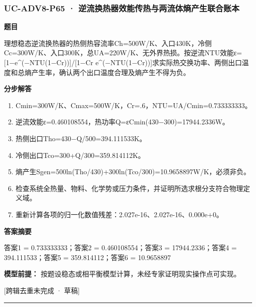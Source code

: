 \documentclass[UTF8,11pt,a4paper]{ctexart}
\begin{document}
\subsubsection*{UC-ADV8-P65 · 逆流换热器效能传热与两流体熵产生联合账本}
\noindent\textbf{题目}\par
理想稳态逆流换热器的热侧热容流率Ch=500W/K、入口430K，冷侧Cc=300W/K、入口300K，总UA=220W/K、无外界热损。按逆流NTU效能ε=[1−e\textasciicircum{}(−NTU(1−Cr))]/[1−Cr e\textasciicircum{}(−NTU(1−Cr))]求实际热交换功率、两侧出口温度和总熵产生率，确认两个出口温度合理及熵产生不得为负。\par
\medskip\noindent\textbf{分步解答}
\begin{enumerate}
\item Cmin=300W/K、Cmax=500W/K，Cr=.6，NTU=UA/Cmin=0.733333333。
\item 逆流效能ε=0.460108554，热功率Q=εCmin(430−300)=17944.2336W。
\item 热侧出口Tho=430−Q/500=394.111533K。
\item 冷侧出口Tco=300+Q/300=359.814112K。
\item 熵产生Sgen=500ln(Tho/430)+300ln(Tco/300)=10.9658897W/K，必须非负。
\item 检查系统全热量、物料、化学势或压力条件，并证明所选求根分支符合物理定义域。
\item 重新计算各项的归一化数值残差：2.027e-16、2.027e-16、0.000e+0。
\end{enumerate}
\noindent\textbf{答案摘要}\par
答案1 = 0.733333333；答案2 = 0.460108554；答案3 = 17944.2336；答案4 = 394.111533；答案5 = 359.814112；答案6 = 10.9658897\par
\noindent\textbf{模型前提：}
按题设稳态或相平衡模型计算，未经专家证明现实操作点可实现。\par
\noindent\textcolor{red!65!black}{[跨辑去重未完成 · 草稿]} \par
\medskip\hrule\medskip
{}
\end{document}
